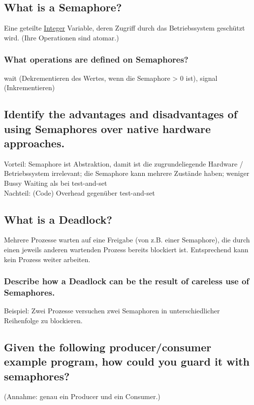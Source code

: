 \subsection{\important What is a Semaphore?}
Eine geteilte \underline{Integer} Variable, deren Zugriff durch das Betriebssystem geschützt wird.
(Ihre Operationen sind atomar.)

\subsubsection{What operations are defined on Semaphores?}
wait (Dekrementieren des Wertes, wenn die Semaphore > 0 ist), signal (Inkrementieren)

\subsection{Identify the advantages and disadvantages of using Semaphores over native hardware approaches.}
Vorteil: Semaphore ist Abstraktion, damit ist die zugrundeliegende Hardware / Betriebssystem irrelevant; die Semaphore kann mehrere Zustände haben; weniger Bussy Waiting als bei test-and-set\\
Nachteil: (Code) Overhead gegenüber test-and-set

\subsection{\important What is a Deadlock?}
Mehrere Prozesse warten auf eine Freigabe (von z.B. einer Semaphore), die durch einen jeweils anderen wartenden Prozess bereits blockiert ist.
Entsprechend kann kein Prozess weiter arbeiten. 

\subsubsection{Describe how a Deadlock can be the result of careless use of Semaphores.}
Beispiel: Zwei Prozesse versuchen zwei Semaphoren in unterschiedlicher Reihenfolge zu blockieren.

\subsection{Given the following producer/consumer example program, how could you guard it with semaphores?}
(Annahme: genau ein Producer und ein Consumer.)

